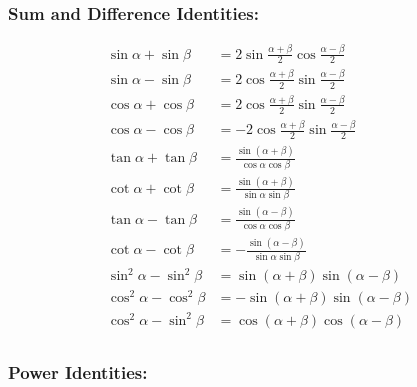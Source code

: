 \documentclass[
]{book}
\begin{document}
\hypertarget{sum-and-difference-identities}{%
\subsubsection*{Sum and Difference Identities:}\label{sum-and-difference-identities}}

\begin{align}
\sin{\alpha} + \sin{\beta} &=  2\sin{\frac{\alpha + \beta}{2}}\cos{\frac{\alpha - \beta}{2}}\\
\sin{\alpha} - \sin{\beta} &=  2\cos{\frac{\alpha + \beta}{2}}\sin{\frac{\alpha - \beta}{2}}\\
\cos{\alpha} + \cos{\beta} &=  2\cos{\frac{\alpha + \beta}{2}}\sin{\frac{\alpha - \beta}{2}}\\
\cos{\alpha} - \cos{\beta} &= -2\cos{\frac{\alpha + \beta}{2}}\sin{\frac{\alpha - \beta}{2}}\\
\tan{\alpha} + \tan{\beta} &=  \frac{\sin\left(\alpha + \beta\right)}{\cos{\alpha}\cos{\beta}}\\
\cot{\alpha} + \cot{\beta} &=  \frac{\sin\left(\alpha + \beta\right)}{\sin{\alpha}\sin{\beta}}\\
\tan{\alpha} - \tan{\beta} &=  \frac{\sin\left(\alpha - \beta\right)}{\cos{\alpha}\cos{\beta}}\\
\cot{\alpha} - \cot{\beta} &= -\frac{\sin\left(\alpha - \beta\right)}{\sin{\alpha}\sin{\beta}}\\
\sin^2{\alpha} - \sin^2{\beta} &=  \sin\left(\alpha + \beta\right) \sin\left(\alpha - \beta\right)\\
\cos^2{\alpha} - \cos^2{\beta} &= -\sin\left(\alpha + \beta\right) \sin\left(\alpha - \beta\right)\\
\cos^2{\alpha} - \sin^2{\beta} &=  \cos\left(\alpha + \beta\right) \cos\left(\alpha - \beta\right)\\
\end{align}

\hypertarget{power-identities}{%
\subsubsection*{Power Identities:}\label{power-identities}}
\end{document}
